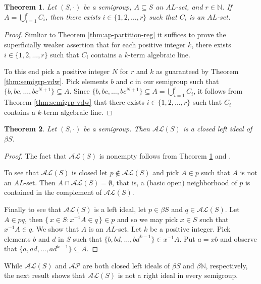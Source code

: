 \documentclass[12pt,showtrims]{memoir}
\theoremstyle{plain}
\newtheorem{thm}{Theorem}[section]
\theoremstyle{definition}
\newcommand{\bbN}{\mathbb{N}}
\newcommand{\AP}{\mathcal{AP}}
\newcommand{\AL}{\mathcal{AL}}
\begin{document}
\begin{thm}
  \label{thm:al-partition-reg}
  Let $(S, \cdot)$ be a semigroup, $A \subseteq S$ an $AL$-set, and $r \in \bbN$.
  If $A = \bigcup_{i=1}^r C_i$, then there exists $i \in \{1, 2, \ldots, r\}$ such that $C_i$ is an $AL$-set.
\end{thm}
\begin{proof}
  Simliar to Theorem \ref{thm:ap-partition-reg} it suffices to prove the superficially weaker assertion that for each positive integer $k$, there exists $i \in \{1, 2, \ldots, r\}$ such that $C_i$ contains a $k$-term algebraic line.
  
  To this end pick a positive integer $N$ for $r$ and $k$ as guaranteed by Theorem \ref{thm:semigrp-vdw}. 
  Pick elements $b$ and $c$ in our semigroup such that $\{b, bc, \ldots, bc^{N+1}\} \subseteq A$. 
  Since $\{b, bc, \ldots, bc^{N+1}\} \subseteq A = \bigcup_{i=1}^r C_i$, it follows from Theorem \ref{thm:semigrp-vdw} that there exists $i \in \{1, 2, \ldots, r\}$ such that $C_i$ contains a $k$-term algebraic line.
\end{proof}

\begin{thm}
  Let $(S, \cdot)$ be a semigroup.
  Then $\AL(S)$ is a closed left ideal of $\beta S$.
\end{thm}
\begin{proof}
  The fact that $\AL(S)$ is nonempty follows from Theorem \ref{thm:al-partition-reg} and \cite[Theorem 3.11]{Hindman:1998fk}. 

  To see that $\AL(S)$ is closed let $p \not\in \AL(S)$ and pick $A \in p$ such that $A$ is not an $AL$-set.
  Then $\overline{A} \cap \AL(S) = \emptyset$, that is, a (basic open) neighborhood of $p$ is contained in the complement of $\AL(S)$.

  Finally to see that $\AL(S)$ is a left ideal, let $p \in \beta S$ and $q \in \AL(S)$. 
  Let $A \in pq$, then $\{\, x \in S : x^{-1}A \in q \,\} \in p$ and so we may pick $x \in S$ such that $x^{-1}A \in q$. 
  We show that $A$ is an $AL$-set.
  Let $k$ be a positive integer.
  Pick elements $b$ and $d$ in $S$ such that $\{b, bd, \ldots, bd^{k-1}\} \in x^{-1}A$.
  Put $a = xb$ and observe that $\{a, ad, \ldots, ad^{k-1}\} \subseteq A$.
\end{proof}

While $\AL(S)$ and $\AP$ are both closed left ideals of $\beta S$ and $\beta \bbN$, respectively, the next result shows that $\AL(S)$ is not a right ideal in every semigroup. 
\end{document}
